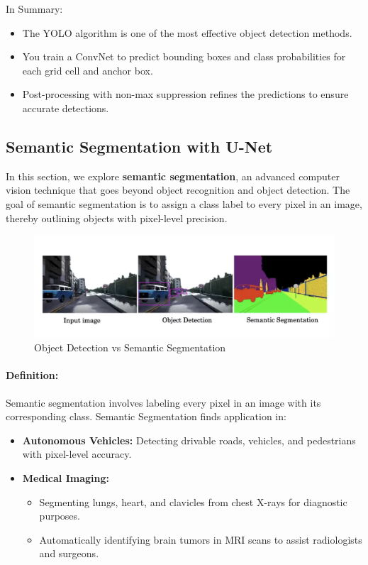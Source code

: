 \documentclass[letterpaper,12pt,notitlepage,twoside]{report}
\begin{document}
In Summary:
\begin{itemize}[nosep]
    \item The YOLO algorithm is one of the most effective object detection methods.
    \item You train a ConvNet to predict bounding boxes and class probabilities for each grid cell and anchor box.
    \item Post-processing with non-max suppression refines the predictions to ensure accurate detections.
\end{itemize}

\subsection{Semantic Segmentation with U-Net}
In this section, we explore \textbf{semantic segmentation}, an advanced computer vision technique that goes beyond object recognition and object detection. The goal of semantic segmentation is to assign a class label to every pixel in an image, thereby outlining objects with pixel-level precision.

\begin{figure}[h]
	\centering
	\includegraphics[width=\textwidth]{Images/Object Detection vs Semantic Segmentation.png}
	\caption{Object Detection vs Semantic Segmentation}
	\label{fig:45}
\end{figure}
\FloatBarrier

\paragraph{Definition:} Semantic segmentation involves labeling every pixel in an image with its corresponding class. Semantic Segmentation finds application in:
\begin{itemize}
    \item \textbf{Autonomous Vehicles:} Detecting drivable roads, vehicles, and pedestrians with pixel-level accuracy.
    \item \textbf{Medical Imaging:} 
    \begin{itemize}
        \item Segmenting lungs, heart, and clavicles from chest X-rays for diagnostic purposes.
        \item Automatically identifying brain tumors in MRI scans to assist radiologists and surgeons.
    \end{itemize}
\end{itemize}
\end{document}
